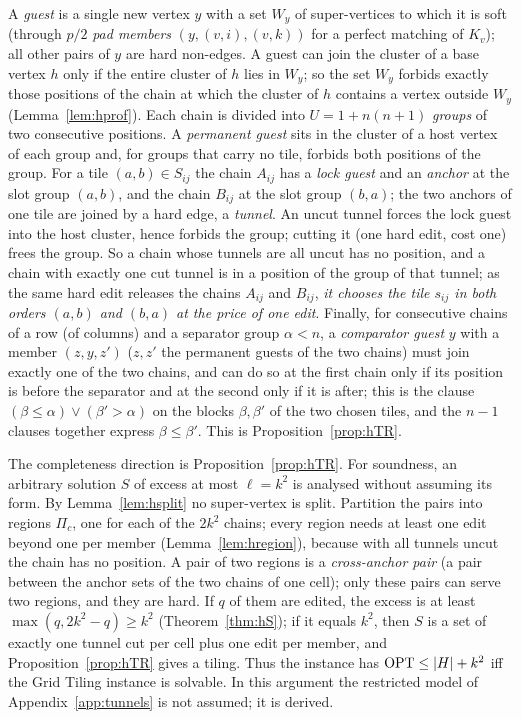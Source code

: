  A \emph{guest} is a single new vertex $y$ with a set $W_y$ of super-vertices to which it is soft (through $p/2$ \emph{pad members} $(y,(v,i),(v,k))$ for a perfect matching of $K_v$); all other pairs of $y$ are hard non-edges. A guest can join the cluster of a base vertex $h$ only if the entire cluster of $h$ lies in $W_y$; so the set $W_y$ forbids exactly those positions of the chain at which the cluster of $h$ contains a vertex outside $W_y$ (Lemma~\ref{lem:hprof}). Each chain is divided into $U=1+n(n+1)$ \emph{groups} of two consecutive positions. A \emph{permanent guest} sits in the cluster of a host vertex of each group and, for groups that carry no tile, forbids both positions of the group. For a tile $(a,b)\in S_{ij}$ the chain $A_{ij}$ has a \emph{lock guest} and an \emph{anchor} at the slot group $(a,b)$, and the chain $B_{ij}$ at the slot group $(b,a)$; the two anchors of one tile are joined by a hard edge, a \emph{tunnel}. An uncut tunnel forces the lock guest into the host cluster, hence forbids the group; cutting it (one hard edit, cost one) frees the group. So a chain whose tunnels are all uncut has no position, and a chain with exactly one cut tunnel is in a position of the group of that tunnel; as the same hard edit releases the chains $A_{ij}$ and $B_{ij}$, \emph{it chooses the tile $s_{ij}$ in both orders $(a,b)$ and $(b,a)$ at the price of one edit}. Finally, for consecutive chains of a row (of columns) and a separator group $\alpha<n$, a \emph{comparator guest} $y$ with a member $(z,y,z')$ ($z,z'$ the permanent guests of the two chains) must join exactly one of the two chains, and can do so at the first chain only if its position is before the separator and at the second only if it is after; this is the clause $(\beta\le\alpha)\vee(\beta'>\alpha)$ on the blocks $\beta,\beta'$ of the two chosen tiles, and the $n-1$ clauses together express $\beta\le\beta'$. This is Proposition~\ref{prop:hTR}.

 The completeness direction is Proposition~\ref{prop:hTR}. For soundness, an arbitrary solution $S$ of excess at most $\ell=k^2$ is analysed without assuming its form. By Lemma~\ref{lem:hsplit} no super-vertex is split. Partition the pairs into regions $\Pi_c$, one for each of the $2k^2$ chains; every region needs at least one edit beyond one per member (Lemma~\ref{lem:hregion}), because with all tunnels uncut the chain has no position. A pair of two regions is a \emph{cross-anchor pair} (a pair between the anchor sets of the two chains of one cell); only these pairs can serve two regions, and they are hard. If $q$ of them are edited, the excess is at least $\max(q,2k^2-q)\ge k^2$ (Theorem~\ref{thm:hS}); if it equals $k^2$, then $S$ is a set of exactly one tunnel cut per cell plus one edit per member, and Proposition~\ref{prop:hTR} gives a tiling. Thus the instance has $\mathrm{OPT}\le|H|+k^2$ iff the Grid Tiling instance is solvable. In this argument the restricted model of Appendix~\ref{app:tunnels} is not assumed; it is derived.


